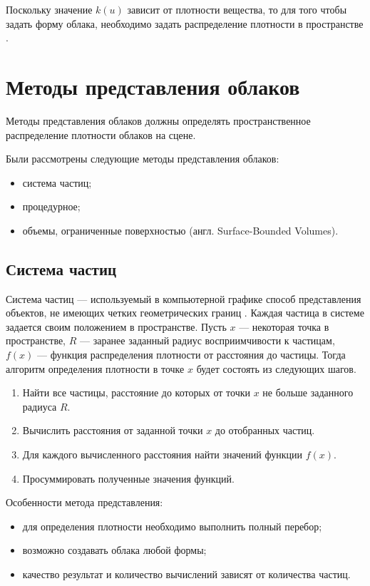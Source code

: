 Поскольку значение $k(u)$ зависит от плотности вещества, то для того чтобы задать форму облака, необходимо задать распределение плотности в пространстве \cite{partmedia, rtvg, hzd, frostbite}.  


\section{Методы представления облаков}
Методы представления облаков должны определять пространственное распределение плотности облаков на сцене.

Были рассмотрены следующие методы представления облаков:
\begin{itemize}
	\item система частиц;
	\item процедурное;
	\item объемы, ограниченные поверхностью (англ. Surface-Bounded Volumes).
\end{itemize}

\subsection{Система частиц}
\label{particles}
Система частиц --- используемый в компьютерной графике способ представления объектов, не имеющих четких геометрических границ \cite{particles1}. 
Каждая частица в системе задается своим положением в пространстве. Пусть $x$ --- некоторая точка в пространстве, $R$ --- заранее заданный радиус восприимчивости к частицам, $f(x)$ --- функция распределения плотности от расстояния до частицы. Тогда алгоритм определения плотности в точке $x$ будет состоять из следующих шагов.

\begin{enumerate}
	\item Найти все частицы, расстояние до которых от точки $x$ не больше заданного радиуса $R$.
	\item Вычислить расстояния от заданной точки $x$ до отобранных частиц.
	\item Для каждого вычисленного расстояния найти значений функции $f(x)$.
	\item Просуммировать полученные значения функций.
\end{enumerate}

Особенности метода представления:
\begin{itemize}
	\item для определения плотности необходимо выполнить полный перебор;
	\item возможно создавать облака любой формы;
	\item качество результат и количество вычислений зависят от количества частиц.
\end{itemize}

